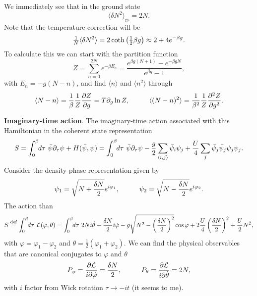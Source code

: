 We immediately see that in the ground state 
\begin{equation}
	\langle \delta N^2\rangle_{\text{gs}} = 2N.
	\label{eq2}
\end{equation}
Note that the temperature correction will be
\begin{equation*}
	\tfrac{1}{N} \langle \delta N^2\rangle = 2 \mathop{\mathrm{coth}}\nolimits\left(\tfrac{1}{2} \beta g\right) \approx 2 + 4 e^{- \beta g}.
\end{equation*}
To calculate this we can start with the partition function
\begin{equation*}
	Z = \sum_{n=0}^{2N} e^{-\beta E_n} = \frac{e^{\beta g (N+1)}-e^{- \beta g N}}{e^{\beta g}-1},
\end{equation*}
with $E_n = - g(N-n)$, and find $\langle n\rangle$ and $\langle n^2\rangle$ through
\begin{equation*}
	\langle N-n\rangle = \frac{1}{\beta} \frac{1}{Z} \frac{\partial Z}{\partial g} = T \partial_g \ln Z,
	\hspace{10 mm} 
	\langle (N-n)^2\rangle = \frac{1}{\beta^2} \frac{1}{Z} \frac{\partial^2 Z}{\partial g^2}.
\end{equation*}



\textbf{Imaginary-time action}. The imaginary-time action associated with this Hamiltonian in the coherent state representation
\begin{equation*}
	S = \int_{0}^{\beta} \hspace{-1mm} d \tau\  \bar{\psi} \partial_\tau \psi + H(\bar{\psi}, \psi)
	=  \int_{0}^{\beta} \hspace{-1mm} d \tau\  
		\bar{\psi} \partial_\tau \psi - \frac{g}{2} \sum_{\langle i,j\rangle} \bar{\psi}_i \psi_j + \frac{U}{4} \sum_j \bar{\psi}_j \bar{\psi}_j \psi_j \psi_j.
\end{equation*}
Consider the density-phase representation given by
\begin{equation*}
	\psi_1 = \sqrt{N + \frac{\delta N}{2}} e^{i \varphi_1},
	\hspace{10 mm} 
	\psi_2 = \sqrt{N - \frac{\delta N}{2}} e^{i \varphi_2}.
\end{equation*}
The action than
\begin{equation}
	S \overset{\mathrm{def}}{=} \int_{0}^{\beta} \hspace{-1mm} d \tau\  \mathcal{L(\varphi, \theta)} = \int_{0}^{\beta} \hspace{-1mm} d \tau\  2N i \dot{\theta} + \frac{\delta N}{2} i \dot{\varphi} - g \sqrt{N^2 - \left(\frac{\delta N}{2}\right)^2} \cos \varphi + 2 \frac{U}{4} \left(\frac{\delta N}{2}\right)^2 + \frac{U}{2} N^2  ,
	\label{eqfull}
\end{equation}
with $\varphi = \varphi_1 - \varphi_2$ and $\theta = \tfrac{1}{2}(\varphi_1 + \varphi_2)$. We can find the physical observables that are canonical conjugates to $\varphi$ and $\theta$
\begin{equation*}
	P_\varphi = \frac{\partial \mathcal{L}}{i \partial \dot{\varphi}} = \frac{\delta N}{2},
	\hspace{10 mm} 
	P_\theta = \frac{\partial \mathcal{L}}{i \partial \dot{\theta}} = 2 N,
\end{equation*}
with $i$ factor from Wick rotation $\tau \to - i t$ (it seems to me). 

